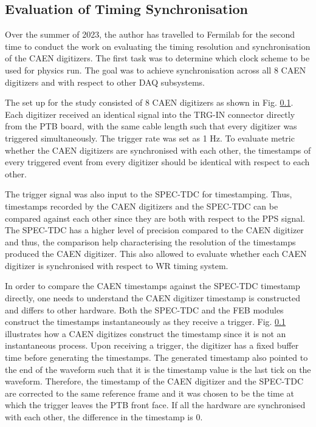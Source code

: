 \subsection{Evaluation of Timing Synchronisation}

Over the summer of 2023, the author has travelled to Fermilab for the second time to conduct the work on evaluating the timing resolution and synchronisation of the CAEN digitizers.
The first task was to determine which clock scheme to be used for physics run. 
The goal was to achieve synchronisation across all 8 CAEN digitizers and with respect to other DAQ subsystems.

The set up for the study consisted of 8 CAEN digitizers as shown in Fig. \ref{}. 
Each digitizer received an identical signal into the TRG-IN connector directly from the PTB board, with the same cable length such that every digitizer was triggered simultaneously.
The trigger rate was set as 1 Hz.
To evaluate metric whether the CAEN digitizers are synchronised with each other, the timestamps of every triggered event from every digitizer should be identical with respect to each other. 

The trigger signal was also input to the SPEC-TDC for timestamping.
Thus, timestamps recorded by the CAEN digitizers and the SPEC-TDC can be compared against each other since they are both with respect to the PPS signal.
The SPEC-TDC has a higher level of precision compared to the CAEN digitizer and thus, the comparison help characterising the resolution of the timestamps produced the CAEN digitizer. 
This also allowed to evaluate whether each CAEN digitizer is synchronised with respect to WR timing system.

In order to compare the CAEN timestamps against the SPEC-TDC timestamp directly, one needs to understand the CAEN digitizer timestamp is constructed and differs to other hardware.
Both the SPEC-TDC and the FEB modules construct the timestamps instantaneously as they receive a trigger.
Fig. \ref{} illustrates how a CAEN digitizes construct the timestamp since it is not an instantaneous process.
Upon receiving a trigger, the digitizer has a fixed buffer time before generating the timestamps.
The generated timestamp also pointed to the end of the waveform such that it is the timestamp value is the last tick on the waveform.
Therefore, the timestamp of the CAEN digitizer and the SPEC-TDC are corrected to the same reference frame and it was chosen to be the time at which the trigger leaves the PTB front face.
If all the hardware are synchronised with each other, the difference in the timestamp is 0.

